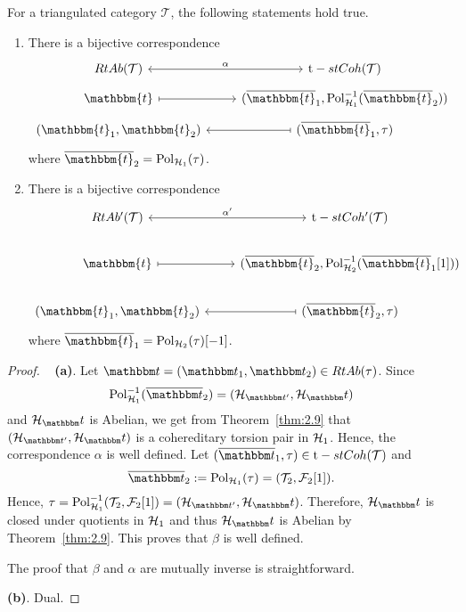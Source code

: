 \begin{thm}\label{thm:2.11}
  For a triangulated category $\mathcal{T}$, the following statements hold true.
  \begin{enumerate}[label=(\alph*)]
    \item There is a bijective correspondence
      \begin{equation*}
        \begin{tikzcd}[row sep=tiny]
          RtAb(\mathcal{T})\arrow[leftrightarrow]{r}{\alpha}
            & \mathrm{t}-stCoh(\mathcal{T})\\
          \mathbbm{t}\arrow[mapsto]{r}
            & (\overline{\mathbbm{t}}_1,\mathrm{Pol}^{-1}_{\mathcal{H}_1}(\overline{\mathbbm{t}}_2))\\
          (\mathbbm{t}_1,\mathbbm{t}_2)\arrow[mapsfrom]{r}
            & (\overline{\mathbbm{t}}_1,\tau)
        \end{tikzcd}
      \end{equation*}
      where $\overline{\mathbbm{t}}_2=\mathrm{Pol}_{\mathcal{H}_1}(\tau)$.
    \item There is a bijective correspondence
      \begin{equation*}
        \begin{tikzcd}
          RtAb^\prime(\mathcal{T})\arrow[leftrightarrow]{r}{\alpha'}
            & \mathrm{t}-stCoh^\prime(\mathcal{T})\\
          \mathbbm{t}\arrow[mapsto]{r}
            & (\overline{\mathbbm{t}}_2,\mathrm{Pol}^{-1}_{\mathcal{H}_2}(\overline{\mathbbm{t}}_1[1]))\\
          (\mathbbm{t}_1,\mathbbm{t}_2)\arrow[mapsfrom]{r}
            & (\overline{\mathbbm{t}}_2,\tau)
        \end{tikzcd}
      \end{equation*}
      where $\overline{\mathbbm{t}}_1=\mathrm{Pol}_{\mathcal{H}_2}(\tau)[-1]$.
  \end{enumerate}
\end{thm}

\begin{proof}
  \ \smallskip\noindent
  \textbf{(a)}. Let $\t=(\t_1,\t_2)\in RtAb(\tau)$. Since
  \[ \mathrm{Pol}_{\clH_1}^{-1}(\overline{\t}_2) = (\clH_{\t'},\clH_\t)\]
  and $\clH_\t$ is Abelian, we get from Theorem~\ref{thm:2.9} that $(\clH_{\t'},\clH_\t)$ is a cohereditary torsion pair in $\mathcal{H}_1$. Hence, the correspondence $\alpha$ is well defined. Let $(\overline{\t}_1,\tau)\in \mathrm{t}-stCoh(\mathcal{T})$ and \[\overline{\t}_2:= \mathrm{Pol}_{\clH_1}(\tau)=(\T_2,\F_2[1]).\] Hence, $\tau=\mathrm{Pol}_{\clH_1}^{-1}(\T_2,\F_2[1])=(\clH_{\t'},\clH_\t)$. Therefore, $\clH_\t$ is closed under quotients in $\mathcal{H}_1$ and thus $\clH_\t$ is Abelian by Theorem~\ref{thm:2.9}. This proves that $\beta$ is well defined.

  The proof that $\beta$ and $\alpha$ are mutually inverse is straightforward.

  \smallskip\noindent
  \textbf{(b)}. Dual.
\end{proof}

